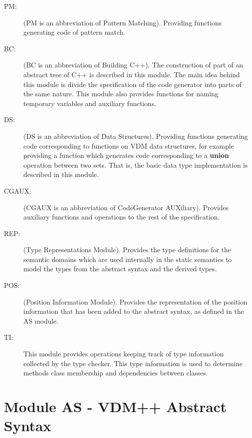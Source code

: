 \documentclass[a4paper,dvips]{article}
\begin{document}
\begin{description}
\item[PM: ] (PM is an abbreviation of Pattern Matching). Providing
  functions generating code of pattern match. 
  
\item[BC: ] (BC is an abbreviation of Building C++). The construction
  of part of an abstract tree of C++ is described in this module. The
  main idea behind this module is divide the specification of the code
  generator into parts of the same nature. This module also provides
  functions for naming temporary variables and auxiliary functions.

\item[DS: ] (DS is an abbreviation of Data Structures). Providing
  functions generating code corresponding to functions on VDM data
  structures, for example providing a function which generates code
  corresponding to a {\bf union} operation between two sets. That is,
  the basic data type implementation is described in this module.

\item[CGAUX:] (CGAUX is an abbreviation of CodeGenerator AUXiliary). Provides auxiliary
  functions and operations to the rest of the specification.

\item[REP: ] (Type Representations Module). Provides the type
  definitions for the semantic domains which are used internally in
  the static semantics to model the types from the abstract syntax and
  the derived types.

\item[POS: ] (Position Information Module).  Provides the representation of the position information that 
has been added to the abstract syntax, as defined in the AS module.

\item[TI:] This module provides operations keeping track of type
  information collected by the type checker. This type information is
  used to determine methods class membership and dependencies between
  classes.

\end{description}


\section{Module AS - VDM++ Abstract Syntax}

\newpage


\newpage
\end{document}
